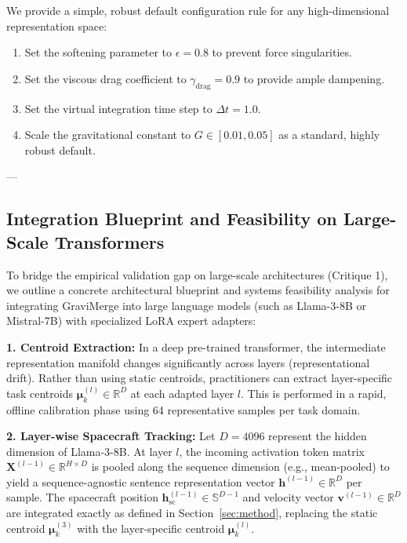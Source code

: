 We provide a simple, robust default configuration rule for any high-dimensional representation space:
\begin{enumerate}
    \item Set the softening parameter to $\epsilon = 0.8$ to prevent force singularities.
    \item Set the viscous drag coefficient to $\gamma_{\text{drag}} = 0.9$ to provide ample dampening.
    \item Set the virtual integration time step to $\Delta t = 1.0$.
    \item Scale the gravitational constant to $G \in [0.01, 0.05]$ as a standard, highly robust default.
\end{enumerate}

---

\subsection{Integration Blueprint and Feasibility on Large-Scale Transformers}
\label{sec:appendix_blueprint}
To bridge the empirical validation gap on large-scale architectures (Critique 1), we outline a concrete architectural blueprint and systems feasibility analysis for integrating GraviMerge into large language models (such as Llama-3-8B or Mistral-7B) with specialized LoRA expert adapters:

\textbf{1. Centroid Extraction: } In a deep pre-trained transformer, the intermediate representation manifold changes significantly across layers (representational drift). Rather than using static centroids, practitioners can extract layer-specific task centroids $\boldsymbol{\mu}_k^{(l)} \in \mathbb{R}^D$ at each adapted layer $l$. This is performed in a rapid, offline calibration phase using 64 representative samples per task domain. 

\textbf{2. Layer-wise Spacecraft Tracking: } Let $D = 4096$ represent the hidden dimension of Llama-3-8B. At layer $l$, the incoming activation token matrix $\mathbf{X}^{(l-1)} \in \mathbb{R}^{H \times D}$ is pooled along the sequence dimension (e.g., mean-pooled) to yield a sequence-agnostic sentence representation vector $\mathbf{h}^{(l-1)} \in \mathbb{R}^D$ per sample. The spacecraft position $\mathbf{h}_{\text{sc}}^{(l-1)} \in \mathbb{S}^{D-1}$ and velocity vector $\mathbf{v}^{(l-1)} \in \mathbb{R}^D$ are integrated exactly as defined in Section~\ref{sec:method}, replacing the static centroid $\boldsymbol{\mu}_k^{(3)}$ with the layer-specific centroid $\boldsymbol{\mu}_k^{(l)}$.

